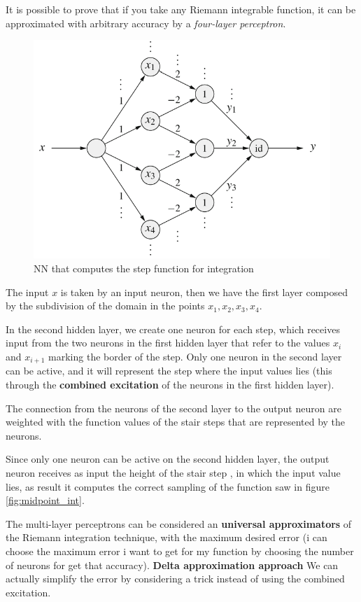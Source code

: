 \documentclass{article}
\begin{document}
It is possible to prove that if you take any Riemann integrable function,
it can be approximated with arbitrary accuracy by a \textit{four-layer
    perceptron}.

\begin{figure}[H]
    \centering
    \includegraphics[scale=0.5]{images/integra_perceptron.png}
    \caption{NN that computes the step function for integration}
\end{figure}

The input $x$ is taken by an input neuron, then we have the first
layer composed by the subdivision of the domain in the points
$x_1, x_2, x_3,x_4$.

In the second hidden layer, we create one neuron for each step,
which receives input from the two neurons in the first hidden layer that
refer to the values $x_i$ and $x_{i+1}$ marking the border of the step.
Only one neuron in the second layer can be active, and it will represent
the step where the input values lies (this through the \textbf{combined
    excitation} of the neurons in the first hidden layer).

The connection from the neurons of the second layer to the output
neuron are weighted with the function values of the stair steps that
are represented by the neurons.

Since only one neuron can be active on the second hidden layer, the
output neuron receives as input the height of the stair step , in which
the input value lies, as result it computes the correct sampling
of the function saw in figure \ref{fig:midpoint_int}.

The multi-layer perceptrons can be considered an \textbf{universal
    approximators} of the Riemann integration technique, with the maximum
desired error (i can choose the maximum error i want to get for my
function by choosing the number of neurons for get that accuracy).\newline\newline
\noindent\textbf{Delta approximation approach}\newline\noindent
We can actually simplify the error by considering a trick instead of using the
combined excitation.
\end{document}
